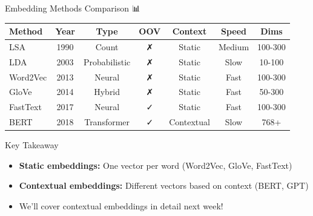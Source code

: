 \documentclass[aspectratio=169]{beamer}
\begin{document}
\begin{frame}{Embedding Methods Comparison 📊}
\begin{center}
\small
\begin{tabular}{lcccccc}
\toprule
\textbf{Method} & \textbf{Year} & \textbf{Type} & \textbf{OOV} & \textbf{Context} & \textbf{Speed} & \textbf{Dims} \\
\midrule
LSA & 1990 & Count & ✗ & Static & Medium & 100-300 \\
LDA & 2003 & Probabilistic & ✗ & Static & Slow & 10-100 \\
Word2Vec & 2013 & Neural & ✗ & Static & Fast & 100-300 \\
GloVe & 2014 & Hybrid & ✗ & Static & Fast & 50-300 \\
FastText & 2017 & Neural & ✓ & Static & Fast & 100-300 \\
\alert{BERT} & 2018 & Transformer & ✓ & \alert{Contextual} & Slow & 768+ \\
\bottomrule
\end{tabular}
\end{center}

\vspace{1em}

\begin{block}{Key Takeaway}
\begin{itemize}\setlength{\itemsep}{0pt}
    \item \textbf{Static embeddings:} One vector per word (Word2Vec, GloVe, FastText)
    \item \textbf{Contextual embeddings:} Different vectors based on context (BERT, GPT)
    \item We'll cover contextual embeddings in detail next week!
\end{itemize}
\end{block}
\end{frame}
\end{document}
